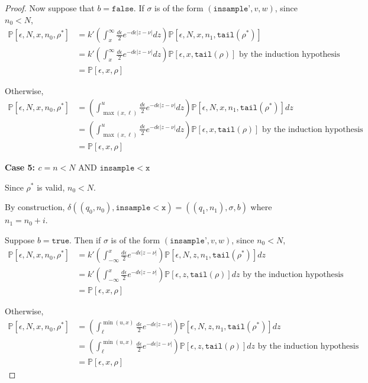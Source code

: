 \documentclass[12pt]{article}
\newcommand{\PP}{\mathbb{P}}
\newcommand{\lguard}{\texttt{insample} < \texttt{x}}
\newcommand{\laguard}{n<N\text{ AND }\texttt{insample} < \texttt{x}}
\theoremstyle{definition}
\begin{document}
\begin{proof}
	Now suppose that $b = \texttt{false}$. If $\sigma$ is of the form $(\texttt{insample'}, v, w)$, since $n_0 < N$, 
	\begin{align*}
		\PP[\epsilon, N, x, n_0, \rho^*] &= k'\left(\int_x^\infty\frac{d\epsilon}{2}e^{-d\epsilon|z-\nu|}dz\right)\PP[\epsilon, N, x, n_1, \texttt{tail}(\rho^*)]\\
		&= k'\left(\int_x^\infty\frac{d\epsilon}{2}e^{-d\epsilon|z-\nu|}dz\right)\PP[\epsilon, x, \texttt{tail}(\rho)] \text{ by the induction hypothesis }\\
		&= \PP[\epsilon, x, \rho]
	\end{align*}

	Otherwise, 
	\begin{align*}
		\PP[\epsilon, N, x, n_0, \rho^*] &= \left(\int_{\max(x, \ell)}^u\frac{d\epsilon}{2}e^{-d\epsilon|z-\nu|}dz\right)\PP[\epsilon, N, x, n_1, \texttt{tail}(\rho^*)]dz \\
		&= \left(\int_{\max(x, \ell)}^u\frac{d\epsilon}{2}e^{-d\epsilon|z-\nu|}dz\right)\PP[\epsilon, x, \texttt{tail}(\rho)] \text{ by the induction hypothesis }\\
		&= \PP[\epsilon, x, \rho]
	\end{align*}

	\textbf{Case 5: $c = \laguard$}

	Since $\rho^*$ is valid, $n_0 < N$. 

	By construction, $\delta((q_0, n_0), \lguard) = ((q_1, n_1), \sigma, b)$ where $n_1 = n_0+i$. 

	Suppose $b = \texttt{true}$. Then if $\sigma$ is of the form $(\texttt{insample'}, v, w)$, since $n_0 < N$, 
		\begin{align*}
			\PP[\epsilon, N, x, n_0, \rho^*] &= k'\left(\int_{-\infty}^x\frac{d\epsilon}{2}e^{-d\epsilon|z-\nu|}\right)\PP[\epsilon, N, z, n_1, \texttt{tail}(\rho^*)]dz \\
			&= k'\left(\int_{-\infty}^x\frac{d\epsilon}{2}e^{-d\epsilon|z-\nu|}\right)\PP[\epsilon, z, \texttt{tail}(\rho)]dz \text{ by the induction hypothesis }\\
			&= \PP[\epsilon, x, \rho]
		\end{align*}

	
	Otherwise, 
	\begin{align*}
		\PP[\epsilon, N, x, n_0, \rho^*] &= \left(\int_{\ell}^{\min(u, x)}\frac{d\epsilon}{2}e^{-d\epsilon|z-\nu|}\right)\PP[\epsilon, N, z, n_1, \texttt{tail}(\rho^*)]dz \\
		&= \left(\int_{\ell}^{\min(u, x)}\frac{d\epsilon}{2}e^{-d\epsilon|z-\nu|}\right)\PP[\epsilon, z, \texttt{tail}(\rho)]dz \text{ by the induction hypothesis }\\
		&= \PP[\epsilon, x, \rho]
	\end{align*}


\end{proof}
\end{document}
